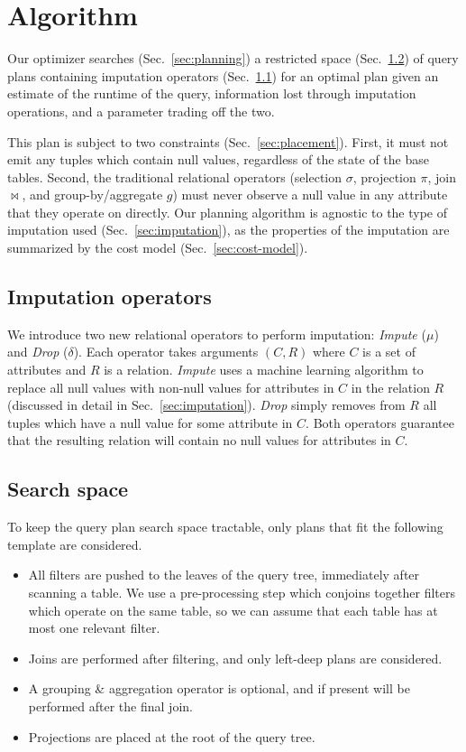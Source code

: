 \section{Algorithm}

Our optimizer searches (Sec.~\ref{sec:planning}) a restricted space (Sec.~\ref{sec:search-space}) of query plans containing imputation operators (Sec.~\ref{sec:operators}) for an optimal plan given an estimate of the runtime of the query, information lost through imputation operations, and a parameter trading off the two.

This plan is subject to two constraints (Sec.~\ref{sec:placement}).
First, it must not emit any tuples which contain null values, regardless of the state of the base tables.
Second, the traditional relational operators (selection $\sigma$, projection $\pi$, join $\bowtie$, and group-by/aggregate $g$) must never observe a null value in any attribute that they operate on directly.
Our planning algorithm is agnostic to the type of imputation used (Sec.~\ref{sec:imputation}), as the properties of the imputation are summarized by the cost model (Sec.~\ref{sec:cost-model}).

\subsection{Imputation operators}
\label{sec:operators}
We introduce two new relational operators to perform imputation: \textit{Impute} ($\mu$) and
\textit{Drop} ($\delta$). Each operator takes arguments $(C, R)$ where $C$ is a set of
attributes and $R$ is a relation. \textit{Impute} uses a machine learning algorithm to
replace all null values with non-null values for attributes in $C$ in the relation $R$ (discussed in detail in Sec.~\ref{sec:imputation}).
\textit{Drop} simply removes from $R$ all tuples which have a null value for some attribute in $C$.
Both operators guarantee that the resulting relation will contain no null values for
attributes in $C$.  

\subsection{Search space}
\label{sec:search-space}
To keep the query plan search space tractable, only plans that fit the following template are considered.

\begin{itemize}
\item All filters are pushed to the leaves of the query tree, immediately after scanning a table. We use a pre-processing step which conjoins together filters which operate on the same table, so we can assume that each table has at most one relevant filter.

\item Joins are performed after filtering, and only left-deep plans are considered.

\item A grouping \& aggregation operator is optional, and if present will be performed after the final join.

\item Projections are placed at the root of the query tree.
\end{itemize}
  
